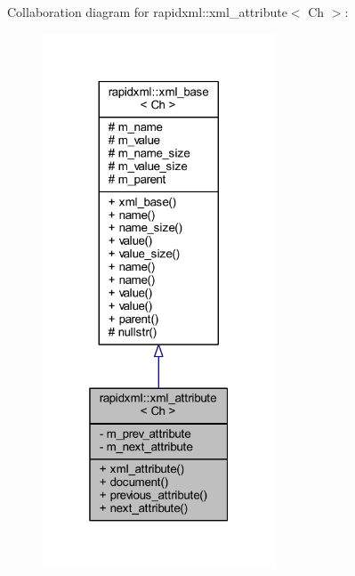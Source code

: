 Collaboration diagram for rapidxml\+:\+:xml\+\_\+attribute$<$ Ch $>$\+:
\nopagebreak
\begin{figure}[H]
\begin{center}
\leavevmode
\includegraphics[width=196pt]{singletonrapidxml_1_1xml__attribute__coll__graph}
\end{center}
\end{figure}
